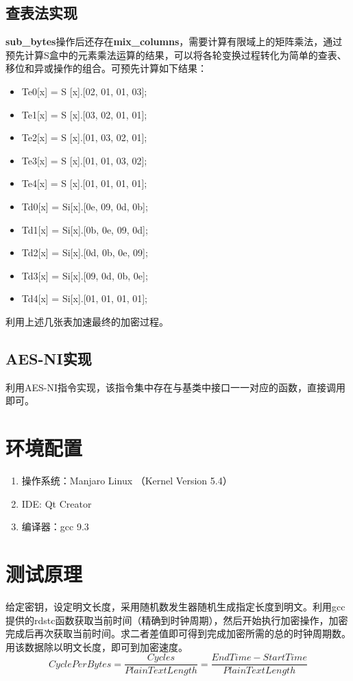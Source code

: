 \documentclass{article} %
\begin{document}
\begin{CJK}{UTF8}{gbsn}
\subsection{查表法实现}
\textbf{sub\_bytes}操作后还存在\textbf{mix\_columns}，需要计算有限域上的矩阵乘法，通过预先计算S盒中的元素乘法运算的结果，可以将各轮变换过程转化为简单的查表、移位和异或操作的组合。可预先计算如下结果：
\begin{itemize}
  \item Te0[x] = S [x].[02, 01, 01, 03];
\item Te1[x] = S [x].[03, 02, 01, 01];
\item Te2[x] = S [x].[01, 03, 02, 01];
\item Te3[x] = S [x].[01, 01, 03, 02];
\item Te4[x] = S [x].[01, 01, 01, 01];

\item Td0[x] = Si[x].[0e, 09, 0d, 0b];
\item Td1[x] = Si[x].[0b, 0e, 09, 0d];
\item Td2[x] = Si[x].[0d, 0b, 0e, 09];
\item Td3[x] = Si[x].[09, 0d, 0b, 0e];
\item Td4[x] = Si[x].[01, 01, 01, 01];
\end{itemize}

利用上述几张表加速最终的加密过程。

\subsection{AES-NI实现}
利用AES-NI指令实现，该指令集中存在与基类中接口一一对应的函数，直接调用即可。
\section{环境配置}
\begin{enumerate}
  \item 操作系统：Manjaro Linux （Kernel Version 5.4）
  \item IDE: Qt Creator
  \item 编译器：gcc 9.3
\end{enumerate}

\section{测试原理}
给定密钥，设定明文长度，采用随机数发生器随机生成指定长度到明文。利用gcc提供的rdstc函数获取当前时间（精确到时钟周期），然后开始执行加密操作，加密完成后再次获取当前时间。求二者差值即可得到完成加密所需的总的时钟周期数。用该数据除以明文长度，即可到加密速度。
\[
Cycle Per Bytes = \frac{Cycles}{PlainTextLength} = \frac{EndTime - StartTime}{PlainTextLength}
\]


\end{CJK}
\end{document}

